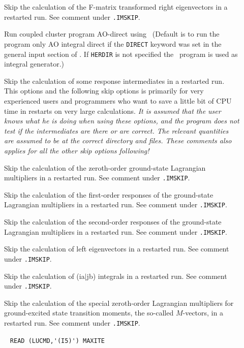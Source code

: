 \begin{description}
\item[] 
   Skip the calculation of the F-matrix transformed right eigenvectors
   in a restarted run. See comment under \verb|.IMSKIP|.
%
\item[] 
       Run coupled cluster program AO-direct  using \her\
       (Default is to run the program only AO integral direct
       if the \verb+DIRECT+ keyword was set in the general
       input section of \siraba . If \verb+HERDIR+ is not specified the \eri\
       program is used as integral generator.) 
%
\item[] 
   Skip the calculation of some response intermediates in a restarted run.
   This options and the following skip options is primarily for very experienced users 
   and programmers who want to save a little bit of CPU time in restarts on very large 
   calculations. 
   {\em It is assumed that the user knows what he is doing when using these options, and
   the program does not test if the intermediates are there or are correct. 
   The relevant quantities are assumed to be at the correct directory and files.
   These comments also applies for all the other skip options following! }
%
\item[\Key{L0SKIP}]  
   Skip the calculation of the zeroth-order ground-state Lagrangian
   multipliers in a restarted run. See comment under \verb|.IMSKIP|.
%
\item[\Key{L1SKIP}] 
   Skip the calculation of the first-order responses of the 
   ground-state Lagrangian multipliers in a restarted run. See comment under \verb|.IMSKIP|.
%
\item[\Key{L2SKIP}]  
   Skip the calculation of the second-order responses of the 
   ground-state Lagrangian multipliers in a restarted run. See comment under \verb|.IMSKIP|.
%
\item[\Key{LESKIP}]  
   Skip the calculation of left eigenvectors
   in a restarted run. See comment under \verb|.IMSKIP|.
%
\item[] 
   Skip the calculation of (ia$\mid$jb) integrals in a restarted run. See comment under \verb|.IMSKIP|.
%
\item[\Key{M1SKIP}] 
   Skip the calculation of the special zeroth-order Lagrangian 
   multipliers for ground-excited state transition moments,
   the so-called $M$-vectors, in a restarted run. See comment under \verb|.IMSKIP|.
%
\item[\Key{MAX IT}] \verb| |\newline
  \verb|READ (LUCMD,'(I5)') MAXITE|


\end{description}
